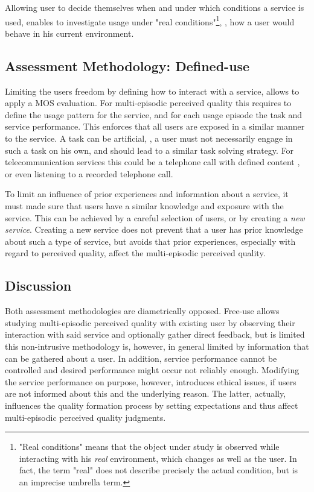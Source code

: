 Allowing user to decide themselves when and under which conditions a service is used, enables to investigate usage under "real conditions"\footnote{"Real conditions" means that the object under study is observed while interacting with his \emph{real} environment, which changes as well as the user. In fact, the term "real" does not describe precisely the actual condition, but is an imprecise umbrella term.}, \ie, how a user would behave in his current environment.

\subsection{Assessment Methodology: Defined-use}
Limiting the users freedom by defining how to interact with a service, allows to apply a \ac{MOS} evaluation.
For multi-episodic perceived quality this requires to define the usage pattern for the service, and for each usage episode the task and service performance.
This enforces that all users are exposed in a similar manner to the service.
A task can be artificial, \ie, a user must not necessarily engage in such a task on his own, and should lead to a similar task solving strategy.
For telecommunication services this could be a telephone call with defined content \citep[cf.][]{itu-t_p.805:_2007}, or even listening to a recorded telephone call.

To limit an influence of prior experiences and information about a service, it must made sure that users have a similar knowledge and exposure with the service.
This can be achieved by a careful selection of users, or by creating a \emph{new service}.
Creating a new service does not prevent that a user has prior knowledge about such a type of service, but avoids that prior experiences, especially with regard to perceived quality, affect the multi-episodic perceived quality.

\subsection{Discussion}
Both assessment methodologies are diametrically opposed. 
Free-use allows studying multi-episodic perceived quality with existing user by observing their interaction with said service and optionally gather direct feedback, but is limited this non-intrusive methodology is, however, in general limited by information that can be gathered about a user.
In addition, service performance cannot be controlled and desired performance might occur not reliably enough.
Modifying the service performance on purpose, however, introduces ethical issues, if users are not informed about this and the underlying reason.
The latter, actually, influences the quality formation process by setting expectations and thus affect multi-episodic perceived quality judgments.

